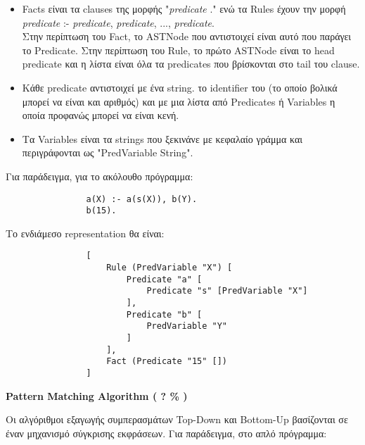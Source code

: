 \documentclass[10pt]{article}
\begin{document}
\begin{itemize}

\item Facts είναι τα clauses της μορφής "\textit{predicate} ." ενώ τα Rules έχουν την μορφή\\


\textit{predicate}  :- \textit{predicate}, \textit{predicate}, ..., \textit{predicate}.\\ 



Στην περίπτωση του Fact, το ASTNode που αντιστοιχεί είναι αυτό που παράγει το Predicate. Στην περίπτωση του Rule, το πρώτο ASTNode είναι το head predicate και η λίστα είναι όλα τα predicates που βρίσκονται στο tail του clause.

\item Κάθε predicate αντιστοιχεί με ένα string. το identifier του (το οποίο βολικά μπορεί να είναι και αριθμός) και με μια λίστα από Predicates ή Variables η οποία προφανώς μπορεί να είναι κενή.

\item Τα Variables είναι τα strings που ξεκινάνε με κεφαλαίο γράμμα και περιγράφονται ως "PredVariable String".

\end{itemize}

Για παράδειγμα, για το ακόλουθο πρόγραμμα:


\begin{verbatim}
                a(X) :- a(s(X)), b(Y).
                b(15).
\end{verbatim}

Το ενδιάμεσο representation θα είναι:

\begin{verbatim}
                [
                    Rule (PredVariable "X") [
                        Predicate "a" [
                            Predicate "s" [PredVariable "X"]
                        ],
                        Predicate "b" [
                            PredVariable "Y"
                        ]
                    ],
                    Fact (Predicate "15" [])
                ]

\end{verbatim}



\textbf{Pattern Matching Algorithm ( ? \% )}

Οι αλγόριθμοι εξαγωγής συμπερασμάτων Top-Down και Bottom-Up βασίζονται σε έναν μηχανισμό σύγκρισης εκφράσεων. Για παράδειγμα, στο απλό πρόγραμμα:
\end{document}
